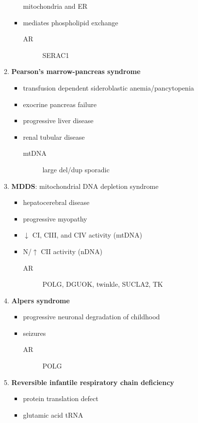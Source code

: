\documentclass[12pt]{scrartcl}
\begin{document}
\begin{enumerate}
\begin{enumerate}
\begin{itemize}
mitochondria and ER
\item mediates phospholipid exchange
\begin{description}
\item[{AR}] SERAC1
\end{description}
\end{itemize}
\item \textbf{Pearson's marrow-pancreas syndrome}
\label{sec:org0db8098}
\begin{itemize}
\item transfusion dependent sideroblastic anemia/pancytopenia
\item exocrine pancreas failure
\item progressive liver disease
\item renal tubular disease
\begin{description}
\item[{mtDNA}] large del/dup sporadic
\end{description}
\end{itemize}
\item \textbf{MDDS}: mitochondrial DNA depletion syndrome
\label{sec:org6c651ac}
\begin{itemize}
\item hepatocerebral disease
\item progressive myopathy
\item \(\downarrow\) CI, CIII, and CIV activity (mtDNA)
\item N/\(\uparrow\) CII activity (nDNA)
\begin{description}
\item[{AR}] POLG, DGUOK, twinkle, SUCLA2, TK
\end{description}
\end{itemize}
\item \textbf{Alpers syndrome}
\label{sec:org254452d}
\begin{itemize}
\item progressive neuronal degradation of childhood
\item seizures
\begin{description}
\item[{AR}] POLG
\end{description}
\end{itemize}
\item \textbf{Reversible infantile respiratory chain deficiency}
\label{sec:orga81be10}
\begin{itemize}
\item protein translation defect
\item glutamic acid tRNA

\end{itemize}
\end{enumerate}
\end{enumerate}
\end{document}
